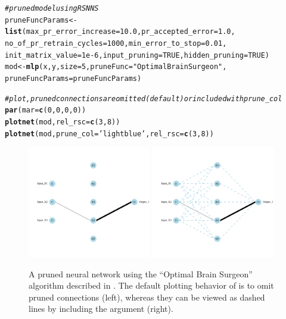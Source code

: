 \documentclass[article,shortnames]{jss}\usepackage[]{graphicx}\usepackage[]{color}
\makeatletter
\newcommand{\hlnum}[1]{\textcolor[rgb]{0.686,0.059,0.569}{#1}}%
\newcommand{\hlstr}[1]{\textcolor[rgb]{0.192,0.494,0.8}{#1}}%
\newcommand{\hlcom}[1]{\textcolor[rgb]{0.678,0.584,0.686}{\textit{#1}}}%
\newcommand{\hlstd}[1]{\textcolor[rgb]{0.345,0.345,0.345}{#1}}%
\newcommand{\hlkwb}[1]{\textcolor[rgb]{0.69,0.353,0.396}{#1}}%
\newcommand{\hlkwc}[1]{\textcolor[rgb]{0.333,0.667,0.333}{#1}}%
\newcommand{\hlkwd}[1]{\textcolor[rgb]{0.737,0.353,0.396}{\textbf{#1}}}%
\newenvironment{kframe}{%
 \def\at@end@of@kframe{}%
 \ifinner\ifhmode%
  \def\at@end@of@kframe{\end{minipage}}%
  \begin{minipage}{\columnwidth}%
 \fi\fi%
 \def\FrameCommand##1{\hskip\@totalleftmargin \hskip-\fboxsep
 \colorbox{shadecolor}{##1}\hskip-\fboxsep
     \hskip-\linewidth \hskip-\@totalleftmargin \hskip\columnwidth}%
 \MakeFramed {\advance\hsize-\width
   \@totalleftmargin\z@ \linewidth\hsize
   \@setminipage}}%
 {\par\unskip\endMakeFramed%
 \at@end@of@kframe}
\makeatother
\begin{document}
\begin{kframe}
\begin{alltt}
\hlcom{# pruned model using RSNNS}
\hlstd{pruneFuncParams} \hlkwb{<-} \hlkwd{list}\hlstd{(}\hlkwc{max_pr_error_increase} \hlstd{=} \hlnum{10.0}\hlstd{,} \hlkwc{pr_accepted_error} \hlstd{=} \hlnum{1.0}\hlstd{,}
  \hlkwc{no_of_pr_retrain_cycles} \hlstd{=} \hlnum{1000}\hlstd{,} \hlkwc{min_error_to_stop} \hlstd{=} \hlnum{0.01}\hlstd{,}
  \hlkwc{init_matrix_value} \hlstd{=} \hlnum{1e-6}\hlstd{,} \hlkwc{input_pruning} \hlstd{=} \hlnum{TRUE}\hlstd{,} \hlkwc{hidden_pruning} \hlstd{=} \hlnum{TRUE}\hlstd{)}
\hlstd{mod} \hlkwb{<-} \hlkwd{mlp}\hlstd{(x, y,} \hlkwc{size} \hlstd{=} \hlnum{5}\hlstd{,} \hlkwc{pruneFunc} \hlstd{=} \hlstr{"OptimalBrainSurgeon"}\hlstd{,}
 \hlkwc{pruneFuncParams} \hlstd{= pruneFuncParams)}

\hlcom{# plot, pruned connections are omitted (default) or included with prune_col}
\hlkwd{par}\hlstd{(}\hlkwc{mar} \hlstd{=} \hlkwd{c}\hlstd{(}\hlnum{0}\hlstd{,} \hlnum{0}\hlstd{,} \hlnum{0}\hlstd{,} \hlnum{0}\hlstd{))}
\hlkwd{plotnet}\hlstd{(mod,} \hlkwc{rel_rsc} \hlstd{=} \hlkwd{c}\hlstd{(}\hlnum{3}\hlstd{,} \hlnum{8}\hlstd{))}
\hlkwd{plotnet}\hlstd{(mod,} \hlkwc{prune_col} \hlstd{=} \hlstr{'lightblue'}\hlstd{,} \hlkwc{rel_rsc} \hlstd{=} \hlkwd{c}\hlstd{(}\hlnum{3}\hlstd{,} \hlnum{8}\hlstd{))}
\end{alltt}
\end{kframe}\begin{figure}[!ht]

{\centering \includegraphics[width=0.48\textwidth]{figs/plotprune-1} 
\includegraphics[width=0.48\textwidth]{figs/plotprune-2} 

}

\caption{A pruned neural network using the ``Optimal Brain Surgeon'' algorithm described in \citet{Zell98}.  The default plotting behavior of  is to omit pruned connections (left), whereas they can be viewed as dashed lines by including the  argument (right).}\label{fig:plotprune}
\end{figure}
\end{document}
